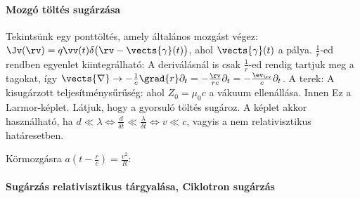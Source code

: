    \paragraph{Mozgó töltés sugárzása}\label{ss:14-mogotoltessugarzasa}
    
    Tekintsünk egy ponttöltés, amely  általános mozgást végez: $\Jv(\rv)=q\vv(t)\delta\big(\rv-\vects{\gamma}(t)\big)$, ahol $\vects{\gamma}(t)$ a pálya. $\frac{1}{r}$-ed rendben  egyenlet kiintegrálható:
    A deriválásnál is csak $\frac{1}{r}$-ed rendig tartjuk meg a tagokat, így $\vects{\nabla}\to-\frac{1}{c}\grad{r}\partial_t=-\frac{\rv}{rc}\partial_t=-\frac{\ev_\rv}{c}\partial_t$.
   A terek:
    A kisugárzott teljesítménysűrűség:
    ahol $Z_0=\mu_0 c$ a vákuum ellenállása.
   Innen
    Ez a Larmor-képlet.
   Látjuk, hogy a gyorsuló töltés sugároz.
   A képlet akkor használható, ha $d\ll \lambda\Leftrightarrow \frac{d}{\delta t}\ll \frac{\lambda}{\delta t}\Leftrightarrow v\ll c$, vagyis a nem relativisztikus határesetben.
    
    Körmozgásra $a\left(t-\frac{r}{c}\right)=\frac{v^2}{R}$:
    
   \paragraph{Sugárzás relativisztikus tárgyalása, Ciklotron sugárzás} 
    
